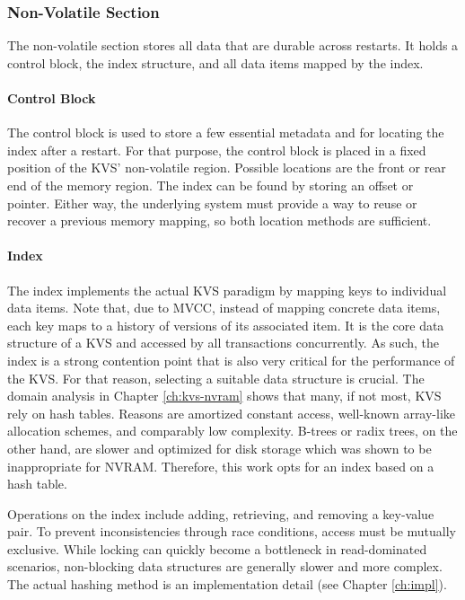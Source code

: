 \subsubsection{Non-Volatile Section}

The non-volatile section stores all data that are durable across restarts. It
holds a control block, the index structure, and all data items mapped by the
index.

\paragraph{Control Block}

The control block is used to store a few essential metadata and for locating the
index after a restart. For that purpose, the control block is placed in a fixed
position of the \ac{KVS}' non-volatile region. Possible locations are the front
or rear end of the memory region. The index can be found by storing an offset or
pointer. Either way, the underlying system must provide a way to reuse or
recover a previous memory mapping, so both location methods are sufficient.

\paragraph{Index}

The index implements the actual \ac{KVS} paradigm by mapping keys to individual
data items. Note that, due to \ac{MVCC}, instead of mapping concrete data items,
each key maps to a history of versions of its associated item. It is the core
data structure of a \ac{KVS} and accessed by all transactions concurrently. As
such, the index is a strong contention point that is also very critical for the
performance of the \ac{KVS}. For that reason, selecting a suitable data
structure is crucial. The domain analysis in Chapter \ref{ch:kvs-nvram} shows
that many, if not most, \ac{KVS} rely on hash tables. Reasons are amortized
constant access, well-known array-like allocation schemes, and comparably low
complexity. B-trees or radix trees, on the other hand, are slower and optimized
for disk storage which was shown to be inappropriate for \ac{NVRAM}. Therefore,
this work opts for an index based on a hash table.

Operations on the index include adding, retrieving, and removing a key-value
pair. To prevent inconsistencies through race conditions, access must be
mutually exclusive. While locking can quickly become a bottleneck in
read-dominated scenarios, non-blocking data structures are generally slower and
more complex. The actual hashing method is an implementation detail (see Chapter \ref{ch:impl}).

